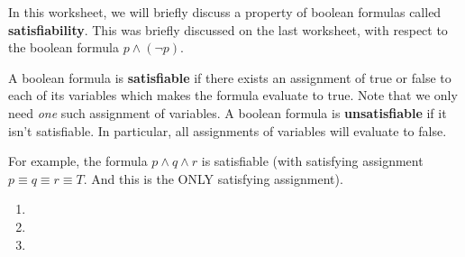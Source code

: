 In this worksheet, we will briefly discuss a property of boolean formulas called \textbf{satisfiability}. This was briefly discussed on the last worksheet, with respect to the boolean formula $p \land (\lnot p)$.

\begin{tcolorbox}
 A boolean formula is \textbf{satisfiable} if there exists an assignment of true or false to each of its variables which makes the formula evaluate to true. Note that we only need \textit{one} such assignment of variables.
 A boolean formula is \textbf{unsatisfiable} if it isn't satisfiable. In particular, all assignments of variables will evaluate to false.
\end{tcolorbox}

For example, the formula $p \land q \land r$ is satisfiable (with satisfying assignment $p \equiv q \equiv r \equiv T$. And this is the ONLY satisfying assignment).
 \begin{enumerate}
   \item 
   \item 
   \item 
 \end{enumerate}